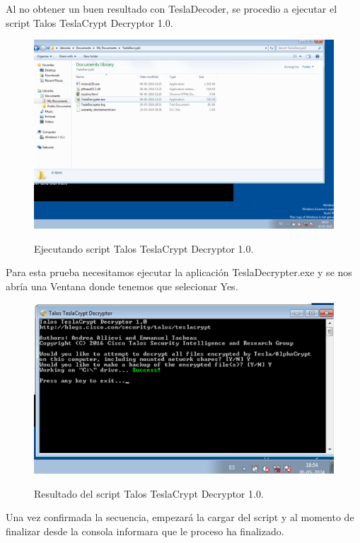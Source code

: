 \documentclass[stu, 11pt, letterpaper, donotrepeattitle, floatsintext, natbib]{apa7}
\begin{document}
Al no obtener un buen resultado con TeslaDecoder, se procedio a ejecutar el script Talos TeslaCrypt Decryptor 1.0.

\begin{figure}[H]
    \centering
    \caption{Ejecutando script Talos TeslaCrypt Decryptor 1.0.}
    \includegraphics[width=0.75\linewidth]{ram13.png} %
    \label{fig:OverallEffect}
\end{figure}

Para esta prueba necesitamos ejecutar la aplicación TeslaDecrypter.exe y se nos abría una Ventana donde tenemos que selecionar Yes.

\begin{figure}[H]
    \centering
    \caption{Resultado del script Talos TeslaCrypt Decryptor 1.0.}
    \includegraphics[width=0.75\linewidth]{ram14.png} %
    \label{fig:OverallEffect}
\end{figure}

Una vez confirmada la secuencia, empezará la cargar del script y al momento de finalizar desde la consola informara que le proceso ha finalizado.
\end{document}
